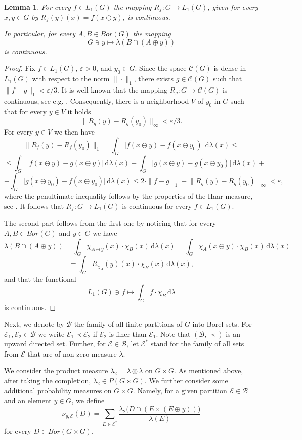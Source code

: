 \documentclass[12pt,fleqn]{amsart}
\numberwithin{equation}{section}
\newtheorem{lemma}[thm]{Lemma}
\theoremstyle{definition}
\def\C{\mathcal C}
\def\ep{\varepsilon}
\newcommand{\cE}{\mathcal E}
\begin{document}
\begin{lemma}\label{cont}
For every $f\in L_1(G)$ the mapping $R_f\colon G\to L_1(G)$, given for every $x,y\in G$ by $R_f(y)(x)=f(x\ominus y)$, is continuous.

In particular, for every $A,B\in Bor(G)$ the mapping
\[ G\ni y\mapsto  \lambda(B\cap(A\oplus y))\]
is continuous.
\end{lemma}
\begin{proof}
Fix $f\in L_1(G)$, $\ep>0$, and $y_0\in G$. Since the space $\C(G)$ is dense in $L_1(G)$ with respect to the norm $\|\cdot\|_1$, there exists $g\in \C(G)$ such that $\|f-g\|_1<\ep/3$. It is well-known that the mapping $R_g\colon G\to \C(G)$ is continuous, see e.g. \cite[Theorem 5.13]{Rudin}. Consequently, there is a neighborhood $V$ of $y_0$ in $G$ such that for every $y\in V$ it holds
\[\big\|R_g(y)-R_g(y_0)\big\|_\infty<\ep/3.\]
For every $y\in V$ we then have
\[\big\|R_f(y)-R_f(y_0)\big\|_1=\int_G\big|f(x\ominus y)-f(x\ominus y_0)\big|\,\mathrm{d}\lambda(x)\le\]
\[\le\int_G\big|f(x\ominus y)-g(x\ominus y)\big|\,\mathrm{d}\lambda(x)+\int_G\big|g(x\ominus y)-g(x\ominus y_0)\big|\,\mathrm{d}\lambda(x)+\]
\[+\int_G\big|g(x\ominus y_0)-f(x\ominus y_0)\big|\,\mathrm{d}\lambda(x)\le2\cdot\|f-g\|_1+\big\|R_g(y)-R_g(y_0)\big\|_\infty<\ep,\]
where the penultimate inequality follows by the properties of the Haar measure, see \cite[Theorem 5.14]{Rudin}. It follows that $R_f\colon G\to L_1(G)$ is continuous for every $f\in L_1(G)$.

The second part follows from the first one by noticing that for every $A,B\in Bor(G)$ and $y\in G$ we have
\[\lambda(B\cap(A\oplus y))=\int_G\chi_{A\oplus y}(x)\cdot\chi_B(x)\,\mathrm{d}\lambda(x)=\int_G\chi_{A}(x\ominus y)\cdot\chi_B(x)\,\mathrm{d}\lambda(x)=\]
\[=\int_G R_{\chi_A}(y)(x)\cdot\chi_B(x)\,\mathrm{d}\lambda(x),\]
and that the functional
\[L_1(G)\ni f\mapsto\int_Gf\cdot\chi_B\,\mathrm{d}\lambda\]
is continuous.
\end{proof}

Next, we denote by $\mathcal{B}$ the family of all finite partitions of $G$ into Borel sets. For $\cE_1, \cE_2 \in \mathcal{B}$ we write $\cE_1\prec \cE_2$ if $\cE_2$ is finer
than $\cE_1$. Note that $(\mathcal{B},\prec)$ is an upward directed set. Further, for $\cE \in \mathcal{B}$, let $\cE^{\ast}$ stand for the family of all sets from $\cE$ that are of non-zero measure $\lambda$.

We consider the product measure $\lambda_2=\lambda\otimes\lambda$
on $G\times G$. As mentioned above, after taking the completion, $\lambda_2\in P(G\times G)$. We further consider some additional probability measures on $G\times G$.
Namely, for a given partition $\cE \in \mathcal{B}$ and an element $y\in G$, we
define
\[ \nu_{y,\cE}(D)=\sum_{E\in\cE^{\ast}}\frac{\lambda_2 \big(D\cap (E\times (E\oplus y))\big)}{\lambda(E)}\]
for every $D\in Bor(G\times G)$.
\end{document}
